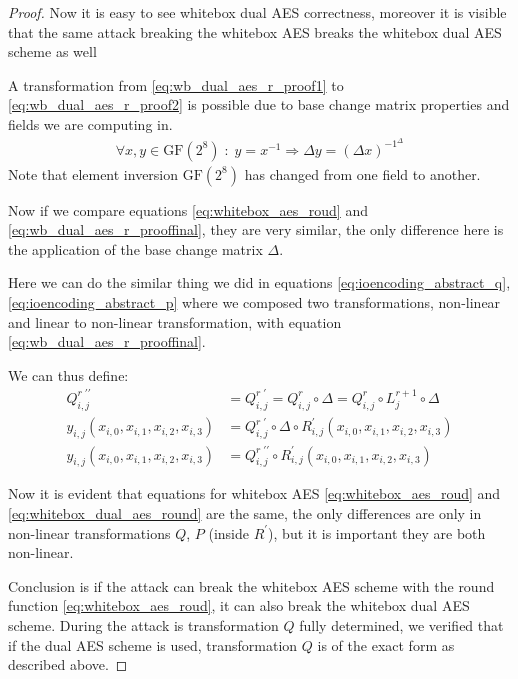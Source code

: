 \documentclass[11pt,oneside,final]{fithesis2}
\newcommand{\gfe}{\ensuremath{\text{GF}\left(2^8\right)}}
\begin{document}
\begin{proof}
	Now it is easy to see whitebox dual AES correctness, moreover it is visible that the same attack breaking the whitebox AES breaks the whitebox dual AES scheme as well 

	A transformation from \ref{eq:wb_dual_aes_r_proof1} to \ref{eq:wb_dual_aes_r_proof2} is possible due to base change matrix properties and fields we are computing in.
	\begin{align}
	    \forall x,y \in \gfe \; : \; y = x^{-1} \Rightarrow  \Delta y = \left( \Delta x \right)^{-1^{\Delta}}
	\end{align}
	Note that element inversion $\gfe$ has changed from one field to another.

	Now if we compare equations \ref{eq:whitebox_aes_roud} and \ref{eq:wb_dual_aes_r_prooffinal}, they are very similar, 
	the only difference here is the application of the base change matrix $\Delta$.

	Here we can do the similar thing we did in equations \ref{eq:ioencoding_abstract_q}, \ref{eq:ioencoding_abstract_p} where we composed
	two transformations, non-linear and linear to non-linear transformation, with equation \ref{eq:wb_dual_aes_r_prooffinal}. 

	We can thus define:
	\begin{subequations}
	\begin{align}
	    Q^{r \; \prime\prime}_{i,j} &= Q^{r \; \prime}_{i,j} = Q^{r}_{i,j} \circ \Delta = Q^{r}_{i,j} \circ L^{r+1}_{j} \circ \Delta \\
	    y_{i,j}\left(x_{i,0}, x_{i,1}, x_{i,2}, x_{i,3}\right) &= Q^{r \; \prime}_{i,j}       \circ \Delta \circ R_{i,j}^{\prime}\left(x_{i,0}, x_{i,1}, x_{i,2}, x_{i,3}\right) \\
	    y_{i,j}\left(x_{i,0}, x_{i,1}, x_{i,2}, x_{i,3}\right) &= Q^{r \; \prime\prime}_{i,j} \circ R_{i,j}^{\prime}\left(x_{i,0}, x_{i,1}, x_{i,2}, x_{i,3}\right) \label{eq:whitebox_dual_aes_round}
	\end{align}
	\end{subequations}

	Now it is evident that equations for whitebox AES \ref{eq:whitebox_aes_roud} and \ref{eq:whitebox_dual_aes_round} are the same, the only differences are only in non-linear 
	transformations $Q$, $P$ (inside $R^{\prime}$), but it is important they are both non-linear.

	Conclusion is if the attack can break the whitebox AES scheme with the round function \ref{eq:whitebox_aes_roud}, it can also break the whitebox dual AES scheme. During the attack is transformation $Q$ 
	fully determined, we verified that if the dual AES scheme is used, transformation $Q$ is of the exact form as described above.
	\end{proof}
\end{document}
